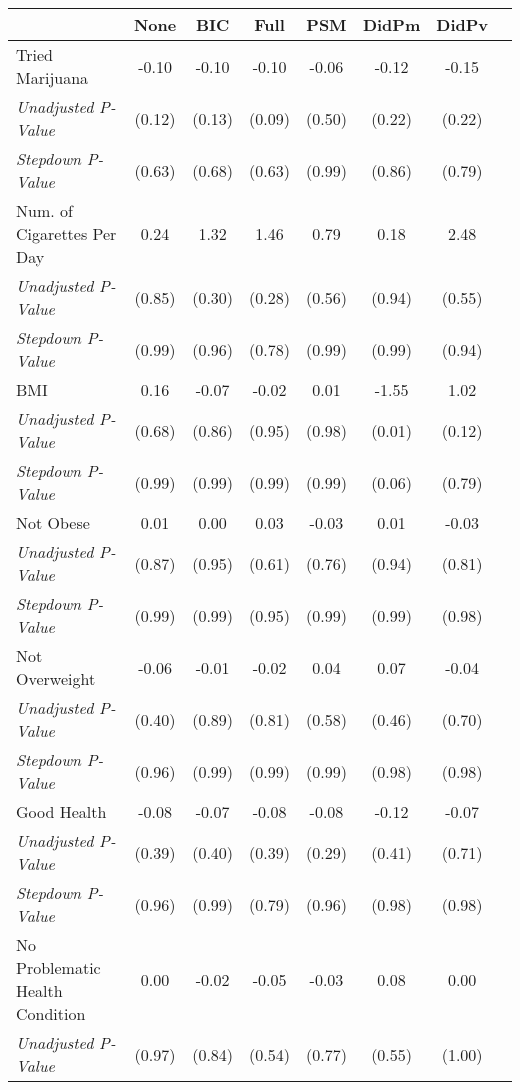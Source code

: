 \begin{tabular}{l c c c c c c c}
\toprule
 & None & BIC & Full & PSM & DidPm & DidPv \\
\midrule
Tried Marijuana & -0.10 & -0.10 & -0.10 & -0.06 & -0.12 & -0.15 \\
\quad \textit{Unadjusted P-Value} & (0.12) & (0.13) & (0.09) & (0.50) & (0.22) & (0.22) \\
\quad \textit{Stepdown P-Value} & (0.63) & (0.68) & (0.63) & (0.99) & (0.86) & (0.79) \\
Num. of Cigarettes Per Day & 0.24 & 1.32 & 1.46 & 0.79 & 0.18 & 2.48 \\
\quad \textit{Unadjusted P-Value} & (0.85) & (0.30) & (0.28) & (0.56) & (0.94) & (0.55) \\
\quad \textit{Stepdown P-Value} & (0.99) & (0.96) & (0.78) & (0.99) & (0.99) & (0.94) \\
BMI & 0.16 & -0.07 & -0.02 & 0.01 & -1.55 & 1.02 \\
\quad \textit{Unadjusted P-Value} & (0.68) & (0.86) & (0.95) & (0.98) & (0.01) & (0.12) \\
\quad \textit{Stepdown P-Value} & (0.99) & (0.99) & (0.99) & (0.99) & (0.06) & (0.79) \\
Not Obese & 0.01 & 0.00 & 0.03 & -0.03 & 0.01 & -0.03 \\
\quad \textit{Unadjusted P-Value} & (0.87) & (0.95) & (0.61) & (0.76) & (0.94) & (0.81) \\
\quad \textit{Stepdown P-Value} & (0.99) & (0.99) & (0.95) & (0.99) & (0.99) & (0.98) \\
Not Overweight & -0.06 & -0.01 & -0.02 & 0.04 & 0.07 & -0.04 \\
\quad \textit{Unadjusted P-Value} & (0.40) & (0.89) & (0.81) & (0.58) & (0.46) & (0.70) \\
\quad \textit{Stepdown P-Value} & (0.96) & (0.99) & (0.99) & (0.99) & (0.98) & (0.98) \\
Good Health & -0.08 & -0.07 & -0.08 & -0.08 & -0.12 & -0.07 \\
\quad \textit{Unadjusted P-Value} & (0.39) & (0.40) & (0.39) & (0.29) & (0.41) & (0.71) \\
\quad \textit{Stepdown P-Value} & (0.96) & (0.99) & (0.79) & (0.96) & (0.98) & (0.98) \\
No Problematic Health Condition & 0.00 & -0.02 & -0.05 & -0.03 & 0.08 & 0.00 \\
\quad \textit{Unadjusted P-Value} & (0.97) & (0.84) & (0.54) & (0.77) & (0.55) & (1.00) \\

\end{tabular}
